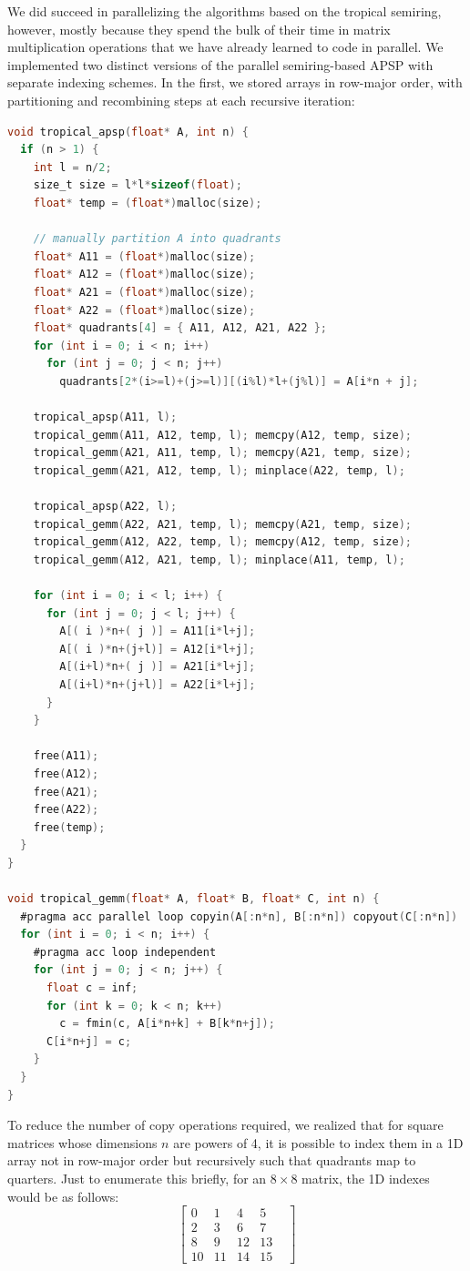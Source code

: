 \documentclass[12pt]{article}
\newcommand*{\ttfamilywithbold}{\fontfamily{lmtt}\selectfont}
\begin{document}
We did succeed in parallelizing the algorithms based on the tropical semiring, however, mostly because they spend the bulk of their time in matrix multiplication operations that we have already learned to code in parallel. We implemented two distinct versions of the parallel semiring-based APSP with separate indexing schemes. In the first, we stored arrays in row-major order, with partitioning and recombining steps at each recursive iteration:

\begin{lstlisting}[language=C,basicstyle=\ttfamilywithbold\footnotesize]
void tropical_apsp(float* A, int n) {
  if (n > 1) {
    int l = n/2;
    size_t size = l*l*sizeof(float);
    float* temp = (float*)malloc(size);

    // manually partition A into quadrants
    float* A11 = (float*)malloc(size);
    float* A12 = (float*)malloc(size);
    float* A21 = (float*)malloc(size);
    float* A22 = (float*)malloc(size);
    float* quadrants[4] = { A11, A12, A21, A22 };
    for (int i = 0; i < n; i++)
      for (int j = 0; j < n; j++)
        quadrants[2*(i>=l)+(j>=l)][(i%l)*l+(j%l)] = A[i*n + j];

    tropical_apsp(A11, l);
    tropical_gemm(A11, A12, temp, l); memcpy(A12, temp, size);
    tropical_gemm(A21, A11, temp, l); memcpy(A21, temp, size);
    tropical_gemm(A21, A12, temp, l); minplace(A22, temp, l);

    tropical_apsp(A22, l);
    tropical_gemm(A22, A21, temp, l); memcpy(A21, temp, size);
    tropical_gemm(A12, A22, temp, l); memcpy(A12, temp, size);
    tropical_gemm(A12, A21, temp, l); minplace(A11, temp, l);

    for (int i = 0; i < l; i++) {
      for (int j = 0; j < l; j++) {
        A[( i )*n+( j )] = A11[i*l+j];
        A[( i )*n+(j+l)] = A12[i*l+j];
        A[(i+l)*n+( j )] = A21[i*l+j];
        A[(i+l)*n+(j+l)] = A22[i*l+j];
      }
    }

    free(A11);
    free(A12);
    free(A21);
    free(A22);
    free(temp);
  }
}

void tropical_gemm(float* A, float* B, float* C, int n) {
  #pragma acc parallel loop copyin(A[:n*n], B[:n*n]) copyout(C[:n*n])
  for (int i = 0; i < n; i++) {
    #pragma acc loop independent
    for (int j = 0; j < n; j++) {
      float c = inf;
      for (int k = 0; k < n; k++)
        c = fmin(c, A[i*n+k] + B[k*n+j]);
      C[i*n+j] = c;
    }
  }
}
\end{lstlisting}

To reduce the number of copy operations required, we realized that for square matrices whose dimensions $n$ are powers of 4, it is possible to index them in a 1D array not in row-major order but recursively such that quadrants map to quarters. Just to enumerate this briefly, for an $8 \times 8$ matrix, the 1D indexes would be as follows:
$$
\begin{bmatrix}
  0  & 1  & 4  & 5  & \\
  2  & 3  & 6  & 7  & \\
  8  & 9  & 12 & 13 & \\
  10 & 11 & 14 & 15 &
\end{bmatrix}
$$
\end{document}
